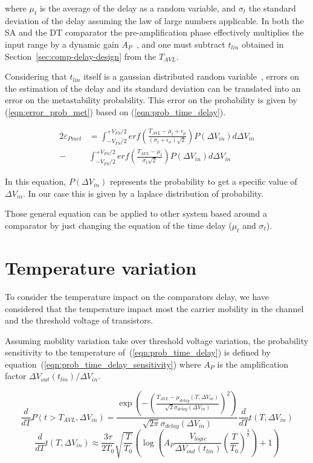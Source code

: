 where $\mu_{t}$ is the average of the delay as a random variable, and $\sigma_{t}$ the standard deviation of the delay assuming the law of large numbers applicable. In both the SA and the DT comparator the pre-amplification phase effectively multiplies the input range by a dynamic gain $A_{P}$~\cite{metastability_figueiredo_2013}, and one must subtract $t_{lin}$ obtained in Section~\ref{sec:comp-delay-design} from the $T_{AVL}$.

Considering that $t_{lin}$  itself is a gaussian distributed random variable~\cite{metastability_figueiredo_2013}, errors on the estimation of the delay and its standard deviation can be translated into an error on the metastability probability. This error on the probability is given by (\ref{eqn:error_prob_met}) based on (\ref{eqn:prob_time_delay}).


\begin{align}
2\varepsilon_{Pmet}& = \int_{-V_{FS}/2}^{+V_{FS}/2}{erf\left(\frac{T_{AVL}-\mu_{t}+\epsilon_{\mu}}{(\sigma_{t}+\epsilon_{\sigma})\sqrt{2}}\right)P(\Delta V_{in})d\Delta V_{in}} \nonumber \\
- &\int_{-V_{FS}/2}^{+V_{FS}/2}{erf\left(\frac{T_{AVL}-\mu_{t}}{\sigma_{t}\sqrt{2}}\right)P(\Delta V_{in})d\Delta V_{in}}
\label{eqn:error_prob_met}
\end{align}

In this equation, $P(\Delta V_{in})$ represents the probability to get a specific value of $\Delta V_{in}$. In our case this is given by a laplace distribution of probability.

Those general equation can be applied to other system based around a comparator by just changing the equation of the time delay ($\mu_{t}$ and $\sigma_{t}$).

\section{Temperature variation}
To consider the temperature impact on the comparators delay, we have considered that the temperature impact most the carrier mobility in the channel and the threshold voltage of transistors.

Assuming mobility variation take over threshold voltage variation, the probability sensitivity to the temperature of~(\ref{eqn:prob_time_delay}) is defined by equation~(\ref{eqn:prob_time_delay_sensitivity}) where $A_P$ is the amplification factor $\Delta V_{out}(t_{lin}) /\Delta V_{in}$.  

\begin{equation}
\frac{d}{dT}P(t > T_{AVL}, \Delta V_{in}) = 
\frac{\exp\left(-{\left(\frac{T_{AVL}-\mu_{delay}(T, \Delta V_{in})}{\sqrt{2}\sigma_{delay}(\Delta V_{in})}\right)}^2 \right)}{\sqrt{2\pi}\sigma_{delay}(\Delta V_{in})} \frac{d}{dT}t(T, \Delta V_{in})
\label{eqn:prob_time_delay_sensitivity}
\end{equation}
\begin{equation}
\frac{d}{dT}t(T, \Delta V_{in}) \approx 
\frac{3\tau}{2 T_0} \sqrt{\frac{T}{T_0}}\left(\log\left(A_P \frac{V_{logic}}{\Delta V_{out}(t_{lin})} {\left(\frac{T}{T_0}\right)}^\frac{3}{2}\right)+1\right)
\label{eqn:time_delay_sensitivity}
\end{equation}

